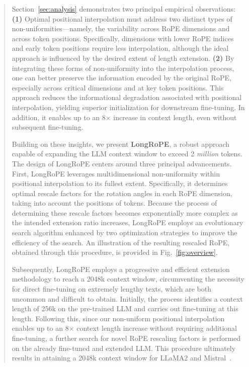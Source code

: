 \begin{abstract}
Section~\ref{sec:analysis} demonstrates two principal empirical observations: \textbf{(1)} Optimal positional interpolation must address two distinct types of non-uniformities—namely, the variability across RoPE dimensions and across token positions. Specifically, dimensions with lower RoPE indices and early token positions require less interpolation, although the ideal approach is influenced by the desired extent of length extension. \textbf{(2)} By integrating these forms of non-uniformity into the interpolation process, one can better preserve the information encoded by the original RoPE, especially across critical dimensions and at key token positions. This approach reduces the informational degradation associated with positional interpolation, yielding superior initialization for downstream fine-tuning. In addition, it enables up to an 8$\times$ increase in context length, even without subsequent fine-tuning.

Building on these insights, we present \textbf{LongRoPE}, a robust approach capable of expanding the LLM context window to exceed 2 \emph{million} tokens. The design of LongRoPE centers around three principal advancements. First, {LongRoPE} leverages multidimensional non-uniformity within positional interpolation to its fullest extent. Specifically, it determines optimal rescale factors for the rotation angles in each RoPE dimension, taking into account the positions of tokens. Because the process of determining these rescale factors becomes exponentially more complex as the intended extension ratio increases, {LongRoPE} employs an evolutionary search algorithm enhanced by two optimization strategies to improve the efficiency of the search. An illustration of the resulting rescaled RoPE, obtained through this procedure, is provided in Fig.~\ref{fig:overview}.

Subsequently, {LongRoPE} employs a progressive and efficient extension methodology to reach a 2048k context window, circumventing the necessity for direct fine-tuning on extremely lengthy texts, which are both uncommon and difficult to obtain. Initially, the process identifies a context length of 256k on the pre-trained LLM and carries out fine-tuning at this length. Following this, since our non-uniform positional interpolation enables up to an 8$\times$ context length increase without requiring additional fine-tuning, a further search for novel RoPE rescaling factors is performed on the already fine-tuned and extended LLM. This procedure ultimately results in attaining a 2048k context window for LLaMA2 and Mistral~\cite{mistral}.


\end{abstract}
